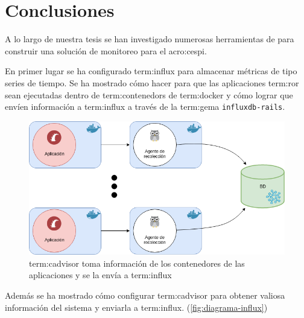 \newpage
\section{Conclusiones}
\label{conclusiones}

A lo largo de nuestra tesis se han investigado numerosas herramientas de
 para construir una solución de monitoreo para el
\gls{acro:cespi}.

En primer lugar se ha configurado \gls{term:influx} para almacenar métricas de
tipo series de tiempo. Se ha mostrado cómo hacer para que las aplicaciones
\gls{term:ror} sean ejecutadas dentro de \glspl{term:contenedor} de
\gls{term:docker} y cómo lograr que envíen información a \gls{term:influx} a
través de la \gls{term:gema} \texttt{influxdb-rails}.

\begin{figure}
  \includegraphics[width=\linewidth]{src/images/conclusiones/influx.png}
  \caption{\gls{term:cadvisor} toma información de los contenedores de las
    aplicaciones y se la envía a \gls{term:influx}}
  \label{fig:diagrama-influx}
\end{figure}

Además se ha mostrado cómo configurar \gls{term:cadvisor} para
obtener valiosa información del sistema y enviarla a \gls{term:influx}.
(\autoref{fig:diagrama-influx})

